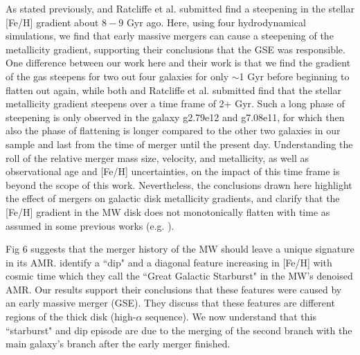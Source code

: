 \documentclass[useAMS,usenatbib]{mnras}
\begin{document}
As stated previously, \cite{Lu2022a} and Ratcliffe et al. submitted find a steepening in the stellar [Fe/H] gradient about $8-9$ Gyr ago. Here, using four hydrodynamical simulations, we find that early massive mergers can cause a steepening of the metallicity gradient, supporting their conclusions that the GSE was responsible. One difference between our work here and their work is that we find the gradient of the gas steepens for two out four galaxies for only $\sim$1 Gyr before beginning to flatten out again, while both \cite{Lu2022a} and Ratcliffe et al. submitted find that the stellar metallicity gradient steepens over a time frame of 2+ Gyr. Such a long phase of steepening is only observed in the galaxy g2.79e12 and g7.08e11, for which then also the phase of flattening is longer compared to the other two galaxies in our sample and last from the time of merger until the present day. Understanding the roll of the relative merger mass size, velocity, and metallicity, as well as observational age and [Fe/H] uncertainties, on the impact of this time frame is beyond the scope of this work. Nevertheless, the conclusions drawn here highlight the effect of mergers on galactic disk metallicity gradients, and clarify that the [Fe/H] gradient in the MW disk does not monotonically flatten with time as assumed in some previous works (e.g. \citealt{Kubryk2015, Minchev2018}).

Fig 6 suggests that the merger history of the MW should leave a unique signature in its AMR. \cite{Ciuca2022} identify a ``dip" and a diagonal feature increasing in [Fe/H] with cosmic time which they call the ``Great Galactic Starburst" in the MW's denoised AMR. Our results support their conclusions that these features were caused by an early massive merger (GSE). They discuss that these features are different regions of the thick disk (high-$\alpha$ sequence). We now understand that this ``starburst" and dip episode are due to the merging of the second branch with the main galaxy's branch after the early merger finished.
\end{document}
